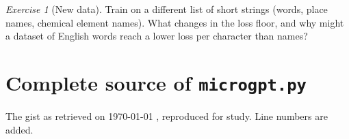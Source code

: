 \documentclass[11pt,letterpaper]{article}
\theoremstyle{remark}
\newtheorem{exercise}{Exercise}
\begin{document}
\begin{exercise}[New data]
Train on a different list of short strings (words, place names, chemical element names). What changes in the loss floor, and why might a dataset of English words reach a lower loss per character than names?
\end{exercise}

\clearpage
\appendix
\section{Complete source of \texttt{microgpt.py}}
\label{app:source}
The gist as retrieved on \today{} \parencite{karpathy2026microgptgist}, reproduced for study. Line numbers are added.


\clearpage
\printbibliography[title={References}]
\end{document}
